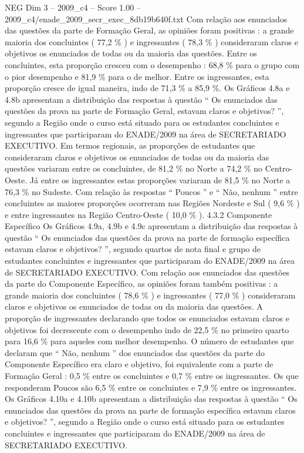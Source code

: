 \begin{textsample}{NEG Dim 3 – 2009\_c4 – Score 1.00 – 2009\_c4/enade\_2009\_secr\_exec\_8db19b640f.txt}
Com relação aos enunciados das questões da parte de Formação Geral, as opiniões foram positivas : a grande maioria dos concluintes ( 77,2 \% ) e ingressantes ( 78,3 \% ) consideraram claros e objetivos os enunciados de todas ou da maioria das questões.
Entre os concluintes, esta proporção cresceu com o desempenho : 68,8 \% para o grupo com o pior desempenho e 81,9 \% para o de melhor.
Entre os ingressantes, esta proporção cresce de igual maneira, indo de 71,3 \% a 85,9 \%.
Os Gráficos 4.8a e 4.8b apresentam a distribuição das respostas à questão “ Os enunciados das questões da prova na parte de Formação Geral, estavam claros e objetivos? ”, segundo a Região onde o curso está situado para os estudantes concluintes e ingressantes que participaram do ENADE/2009 na área de SECRETARIADO EXECUTIVO.
Em termos regionais, as proporções de estudantes que consideraram claros e objetivos os enunciados de todas ou da maioria das questões variaram entre os concluintes, de 81,2 \% no Norte a 74,2 \% no Centro-Oeste.
Já entre os ingressantes estas proporções variaram de 81,5 \% no Norte a 76,3 \% no Sudeste.
Com relação às respostas “ Poucos ” e “ Não, nenhum ” entre concluintes as maiores proporções ocorreram nas Regiões Nordeste e Sul ( 9,6 \% ) e entre ingressantes na Região Centro-Oeste ( 10,0 \% ). 4.3.2 Componente Específico Os Gráficos 4.9a, 4.9b e 4.9c apresentam a distribuição das respostas à questão “ Os enunciados das questões da prova na parte de formação específica estavam claros e objetivos? ”, segundo quartos de nota final e grupo de estudantes concluintes e ingressantes que participaram do ENADE/2009 na área de SECRETARIADO EXECUTIVO.
Com relação aos enunciados das questões da parte do Componente Específico, as opiniões foram também positivas : a grande maioria dos concluintes ( 78,6 \% ) e ingressantes ( 77,0 \% ) consideraram claros e objetivos os enunciados de todas ou da maioria das questões.
A proporção de ingressantes declarando que todos os enunciados estavam claros e objetivos foi decrescente com o desempenho indo de 22,5 \% no primeiro quarto para 16,6 \% para aqueles com melhor desempenho.
O número de estudantes que declaram que “ Não, nenhum ” dos enunciados das questões da parte do Componente Específico era claro e objetivo, foi equivalente com a parte de Formação Geral : 0,5 \% entre os concluintes e 0,7 \% entre os ingressantes.
Os que responderam Poucos são 6,5 \% entre os concluintes e 7,9 \% entre os ingressantes.
Os Gráficos 4.10a e 4.10b apresentam a distribuição das respostas à questão “ Os enunciados das questões da prova na parte de formação específica estavam claros e objetivos? ”, segundo a Região onde o curso está situado para os estudantes concluintes e ingressantes que participaram do ENADE/2009 na área de SECRETARIADO EXECUTIVO.

\end{textsample}
